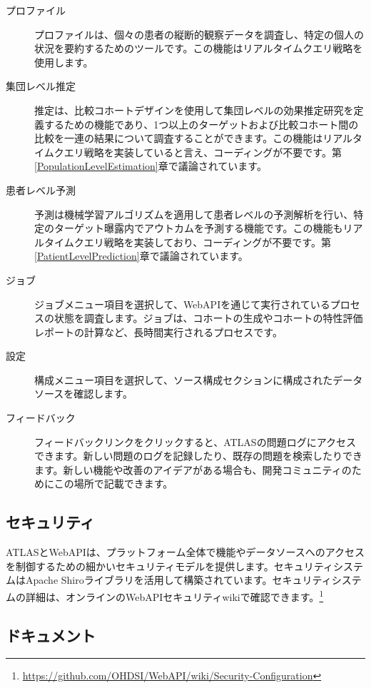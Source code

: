 \documentclass[
  11pt]{book}
\theoremstyle{definition}
\theoremstyle{definition}
\theoremstyle{definition}
\theoremstyle{definition}
\theoremstyle{remark}
\begin{document}
\begin{description}
\item[プロファイル ]
プロファイルは、個々の患者の縦断的観察データを調査し、特定の個人の状況を要約するためのツールです。この機能はリアルタイムクエリ戦略を使用します。
\item[集団レベル推定 ]
推定は、比較コホートデザインを使用して集団レベルの効果推定研究を定義するための機能であり、1つ以上のターゲットおよび比較コホート間の比較を一連の結果について調査することができます。この機能はリアルタイムクエリ戦略を実装していると言え、コーディングが不要です。第\ref{PopulationLevelEstimation}章で議論されています。
\item[患者レベル予測 ]
予測は機械学習アルゴリズムを適用して患者レベルの予測解析を行い、特定のターゲット曝露内でアウトカムを予測する機能です。この機能もリアルタイムクエリ戦略を実装しており、コーディングが不要です。第\ref{PatientLevelPrediction}章で議論されています。
\item[ジョブ ]
ジョブメニュー項目を選択して、WebAPIを通じて実行されているプロセスの状態を調査します。ジョブは、コホートの生成やコホートの特性評価レポートの計算など、長時間実行されるプロセスです。
\item[設定 ]
構成メニュー項目を選択して、ソース構成セクションに構成されたデータソースを確認します。
\item[フィードバック ]
フィードバックリンクをクリックすると、ATLASの問題ログにアクセスできます。新しい問題のログを記録したり、既存の問題を検索したりできます。新しい機能や改善のアイデアがある場合も、開発コミュニティのためにこの場所で記載できます。
\end{description}

\subsection{セキュリティ}\label{ux30bbux30adux30e5ux30eaux30c6ux30a3}

ATLASとWebAPIは、プラットフォーム全体で機能やデータソースへのアクセスを制御するための細かいセキュリティモデルを提供します。セキュリティシステムはApache Shiroライブラリを活用して構築されています。セキュリティシステムの詳細は、オンラインのWebAPIセキュリティwikiで確認できます。\footnote{\url{https://github.com/OHDSI/WebAPI/wiki/Security-Configuration}} 

\subsection{ドキュメント}\label{ux30c9ux30adux30e5ux30e1ux30f3ux30c8}
\end{document}
